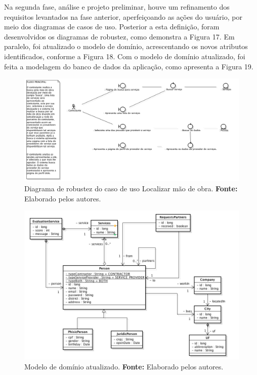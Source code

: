 \par Na segunda fase, análise e projeto preliminar, houve um refinamento dos requisitos levantados na fase anterior, aperfeiçoando as ações do usuário, por meio dos diagramas de casos de uso. Posterior a esta definição, foram desenvolvidos os diagramas de robustez, como demonstra a Figura 17. Em paralelo, foi atualizado o modelo de domínio, acrescentando os novos atributos identificados, conforme a Figura 18. Com o modelo de domínio atualizado, foi feita a modelagem do banco de dados da aplicação, como apresenta a Figura 19.

\begin{figure}[h!]
	\centerline{\includegraphics[scale=0.35]{./imagens/robustez.png}}
	\caption[Diagrama de robustez do caso de uso Localizar mão de obra]
	{Diagrama de robustez do caso de uso Localizar mão de obra. \textbf{Fonte:} Elaborado pelos autores.}
	\label{fig:exemplo1}
\end{figure}

\begin{figure}[h!]
	\centerline{\includegraphics[scale=0.6]{./imagens/modelo-dominio-com-atributos.png}}
	\caption[Modelo de domínio atualizado]
	{Modelo de domínio atualizado. \textbf{Fonte:} Elaborado pelos autores.}
	\label{fig:exemplo1}
\end{figure} 

